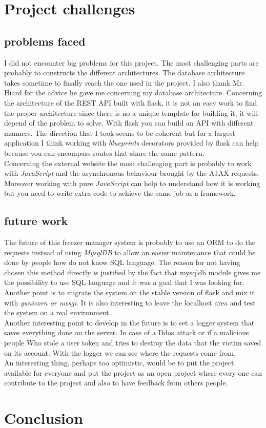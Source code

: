 \section{Project challenges}
\subsection{problems faced}
I did not encounter big problems for this project. The most challenging parts are probably to constructs the different architectures. The database architecture takes sometime to finally reach the one used in the project. I also thank Mr. Hiard for the advice he gave me concerning my database architecture. Concerning the architecture of the REST API built with flask, it is not an easy work to find the proper architecture since there is no a unique template for building it, it will depend of the problem to solve. With flask you can build an API with different manners. The direction that I took seems to be coherent but for a largest application I think working with \textit{blueprints} decorators provided by flask can help because you can encompass routes that share the same pattern.\\

Concerning the external website the most challenging part is probably to work with \textit{JavaScript} and the asynchronous behaviour brought by the AJAX requests. Moreover working with pure \textit{JavaScript} can help to understand how it is working but you need to write extra code to achieve the same job as a framework.
\subsection{future work}
The future of this freezer manager system is probably to use an ORM to do the requests instead of using \textit{MysqlDB} to allow an easier maintenance that could be done by people how do not know SQL language. The reason for not having chosen this method directly is justified by the fact that mysqldb module gives me the possibility to use SQL language and it was a goal that I was looking for.\\

Another point is to migrate the system on the stable version of flask and mix it with \textit{gunicorn or uwsgi}. It is also interesting to leave the localhost area and test the system on a real environment.\\

Another interesting point to develop in the future is to set a logger system that saves everything done on the server. In case of a Ddos attack or if a malicious people Who stole a user token and tries to destroy the data that the victim saved on its account. With the logger we can see where the requests come from.\\

An interesting thing, perhaps too optimistic, would be to put the project available for everyone and put the project as an open project where every one can contribute to the project and also to have feedback from others people.
\section{Conclusion}
